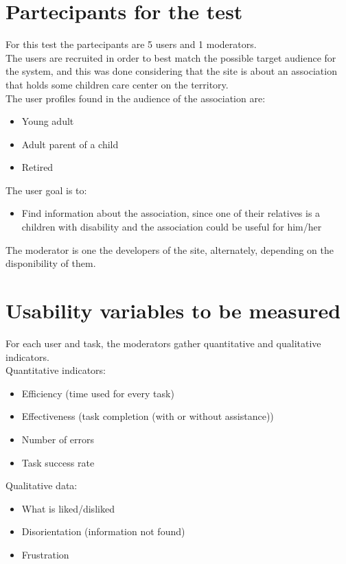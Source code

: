 \section{Partecipants for the test}
For this test the partecipants are 5 users and 1 moderators.\\
The users are recruited in order to best match the possible target audience for the system, and this was done considering that the site is about an association that holds some children care center on the territory.\\
The user profiles found in the audience of the association are: 
\begin{itemize}
\item Young adult
\item Adult parent of a child
\item Retired
\end{itemize}
The user goal is to:
\begin{itemize}
\item Find information about the association, since one of their relatives is a children with disability and the association could be useful for him/her
\end{itemize}
The moderator is one the developers of the site, alternately, depending on the disponibility of them.
%
%
\section{Usability variables to be measured}
For each user and task, the moderators gather quantitative and qualitative indicators.\\
Quantitative indicators:
\begin{itemize}
\item Efficiency (time used for every task)
\item Effectiveness (task completion (with or without assistance))
\item Number of errors
\item Task success rate
\end{itemize}
Qualitative data:
\begin{itemize}
\item What is liked/disliked
\item Disorientation (information not found)
\item Frustration
\end{itemize}
%
%
